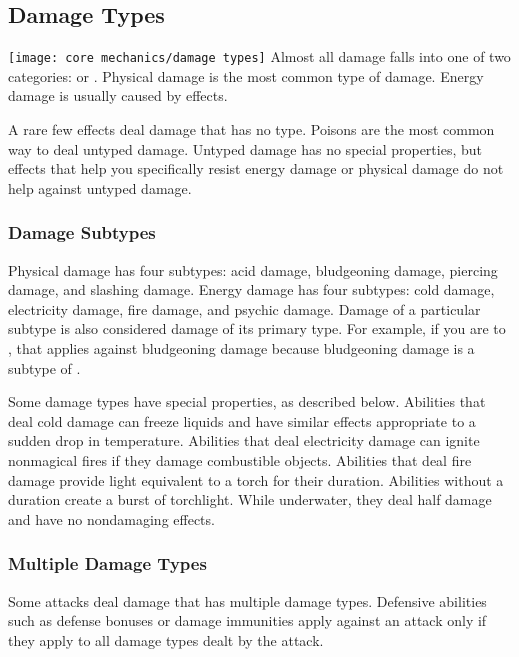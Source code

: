     \subsection{Damage Types}\label{Damage Types}
        \texttt{[image: core mechanics/damage types]}
        Almost all damage falls into one of two categories:  or .
        Physical damage is the most common type of damage.
        Energy damage is usually caused by \magical effects.

        A rare few effects deal damage that has no type.
        Poisons are the most common way to deal untyped damage.
        Untyped damage has no special properties, but effects that help you specifically resist energy damage or physical damage do not help against untyped damage.

        \subsubsection{Damage Subtypes}\label{Damage Subtypes}
            Physical damage has four subtypes: acid damage, bludgeoning damage, piercing damage, and slashing damage.
            Energy damage has four subtypes: cold damage, electricity damage, fire damage, and psychic damage.
            Damage of a particular subtype is also considered damage of its primary type.
            For example, if you are  to , that applies against bludgeoning damage because bludgeoning damage is a subtype of .

            Some damage types have special properties, as described below.
             Abilities that deal cold damage can freeze liquids and have similar effects appropriate to a sudden drop in temperature.
             Abilities that deal electricity damage can ignite nonmagical fires if they damage combustible objects.
             Abilities that deal fire damage provide light equivalent to a torch for their duration.
            Abilities without a duration create a  burst of torchlight.
            While underwater, they deal half damage and have no nondamaging effects.

        \subsubsection{Multiple Damage Types}\label{Multiple Damage Types}
            Some attacks deal damage that has multiple damage types.
            Defensive abilities such as defense bonuses or damage immunities apply against an attack only if they apply to all damage types dealt by the attack.

